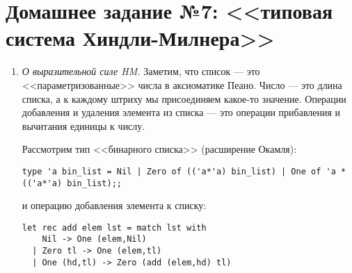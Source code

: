 \documentclass[10pt,a4paper,oneside]{article}
\begin{document}
\section*{Домашнее задание №7: <<типовая система Хиндли-Милнера>>}
\begin{enumerate}
\item \emph{О выразительной силе HM.} Заметим, что список --- это <<параметризованные>> числа в 
аксиоматике Пеано. Число --- это длина списка, а к каждому штриху мы присоединяем какое-то значение.
Операции добавления и удаления элемента из списка --- это операции прибавления и вычитания
единицы к числу.

Рассмотрим тип <<бинарного списка>> (расширение Окамля):

\begin{verbatim}
type 'a bin_list = Nil | Zero of (('a*'a) bin_list) | One of 'a * (('a*'a) bin_list);;
\end{verbatim}

и операцию добавления элемента к списку:

\begin{verbatim}
let rec add elem lst = match lst with
    Nil -> One (elem,Nil)
  | Zero tl -> One (elem,tl)
  | One (hd,tl) -> Zero (add (elem,hd) tl)
\end{verbatim}


\end{enumerate}
\end{document}

